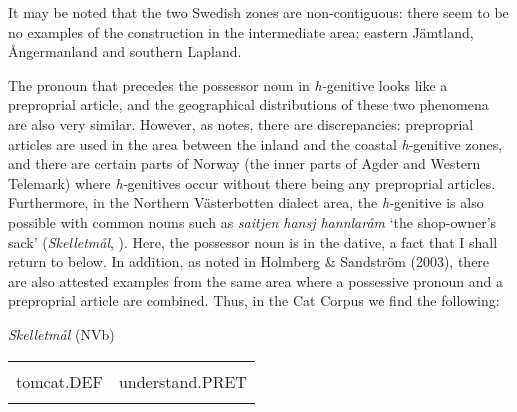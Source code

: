 \begin{styleBodyTextFirst}
It may be noted that the two Swedish zones are non-contiguous: there seem to be no examples of the construction in the intermediate area: eastern Jämtland, Ångermanland and southern Lapland. 

\end{styleBodyTextFirst}

\begin{styleBodytextC}
The pronoun that precedes the possessor noun in \textit{h-}genitive looks like a preproprial article, and the geographical distributions of these two phenomena are also very similar. However, as \citet[67]{Delsing2003b} notes, there are discrepancies: preproprial articles are used\textit{ }in the area between the inland and the coastal \textit{h}{}-genitive zones, and there are certain parts of Norway (the inner parts of Agder and Western Telemark) where \textit{h-}genitives occur without there being any preproprial articles. Furthermore, in the Northern Västerbotten dialect area, the \textit{h-}genitive is also possible with common nouns such as \textit{saitjen hansj hannlaråm} ‘the shop-owner’s sack’ (\textit{Skelletmål}, \citet[23]{Marklund1976}). Here, the possessor noun is in the dative, a fact that I shall return to below. In addition, as noted in Holmberg \& Sandström (2003), there are also attested examples from the same area where a possessive pronoun and a preproprial article are combined. Thus, in the Cat Corpus we find the following:

\end{styleBodytextC}


\begin{listWWNumileveli}
\item 

\begin{styleExample}
\textit{Skelletmål} (NVb)

\end{styleExample}

\end{listWWNumileveli}

\begin{tabular}{ll}
\lsptoprule
\multicolumn{2}{l}{Kattkalln

}\\
tomcat.DEF & understand.PRET\\
\lspbottomrule
\end{tabular}

